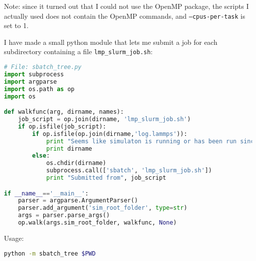 Note: since it turned out that I could not use the OpenMP package, the scripts I actually used does not contain the OpenMP commands, and {\tt --cpus-per-task} is set to 1.

I have made a small python module that lets me submit a job for each subdirectory containing a file {\tt lmp\_slurm\_job.sh}:

\begin{lstlisting}[language=Python]
# File: sbatch_tree.py
import subprocess
import argparse
import os.path as op
import os

def walkfunc(arg, dirname, names):
	job_script = op.join(dirname, 'lmp_slurm_job.sh')
	if op.isfile(job_script):
		if op.isfile(op.join(dirname,'log.lammps')):
			print "Seems like simulaton is running or has been run since there are output files in the folder"
			print dirname
		else:
			os.chdir(dirname)
			subprocess.call(['sbatch', 'lmp_slurm_job.sh'])
			print "Submitted from", job_script 

if __name__=='__main__':
	parser = argparse.ArgumentParser()
	parser.add_argument('sim_root_folder', type=str)
	args = parser.parse_args()
	op.walk(args.sim_root_folder, walkfunc, None)
\end{lstlisting}

Usage:
\begin{lstlisting}[language=Bash]
python -m sbatch_tree $PWD
\end{lstlisting}